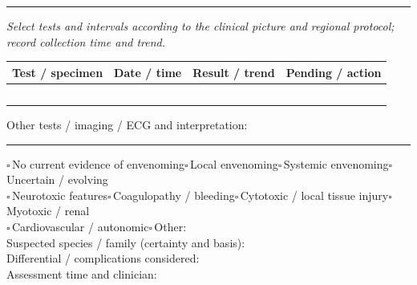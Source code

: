 \documentclass[10pt,a4paper]{article}
\newcommand{\boxx}{\ensuremath{\square}}
\newcommand{\checkitem}[1]{\boxx\,#1\quad}
\newcommand{\linefield}[2]{#1\ \underline{\hspace{#2}}}
\newcommand{\sectionbar}[1]{\vspace{3pt}{\large\bfseries #1}\par\vspace{1pt}\hrule\vspace{3pt}}
\begin{document}
\sectionbar{5. Investigations and results}
\textit{Select tests and intervals according to the clinical picture and regional protocol; record collection time and trend.}\\
\begin{tabularx}{\linewidth}{|p{3.6cm}|p{2.0cm}|X|p{2.4cm}|}
\hline
Test / specimen & Date / time & Result / trend & Pending / action \\
\hline
\rule{0pt}{7mm} & & & \\\hline
\rule{0pt}{7mm} & & & \\\hline
\rule{0pt}{7mm} & & & \\\hline
\rule{0pt}{7mm} & & & \\\hline
\rule{0pt}{7mm} & & & \\\hline
\end{tabularx}
\linefield{Other tests / imaging / ECG and interpretation:}{5.5cm}

\sectionbar{6. Clinical impression}
\checkitem{No current evidence of envenoming}\checkitem{Local envenoming}\checkitem{Systemic envenoming}\checkitem{Uncertain / evolving}\\
\checkitem{Neurotoxic features}\checkitem{Coagulopathy / bleeding}\checkitem{Cytotoxic / local tissue injury}\checkitem{Myotoxic / renal}\\
\checkitem{Cardiovascular / autonomic}\checkitem{Other:}\underline{\hspace{3.0cm}}\\
\linefield{Suspected species / family (certainty and basis):}{5.0cm}\\
\linefield{Differential / complications considered:}{6.0cm}\\
\linefield{Assessment time and clinician:}{5.5cm}
\end{document}

